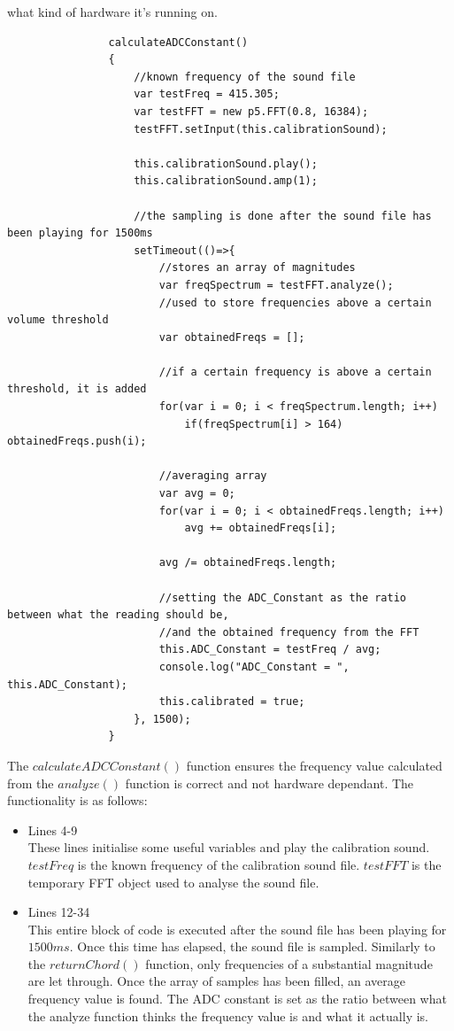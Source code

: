 \documentclass[12pt,a4paper]{article}
\begin{document}
			what kind of hardware it's running on.\\
			\begin{lstlisting}
				calculateADCConstant()
				{
					//known frequency of the sound file
					var testFreq = 415.305;
					var testFFT = new p5.FFT(0.8, 16384);
					testFFT.setInput(this.calibrationSound);
			
					this.calibrationSound.play();
					this.calibrationSound.amp(1);
			
					//the sampling is done after the sound file has been playing for 1500ms
					setTimeout(()=>{
						//stores an array of magnitudes
						var freqSpectrum = testFFT.analyze();
						//used to store frequencies above a certain volume threshold
						var obtainedFreqs = [];
				
						//if a certain frequency is above a certain threshold, it is added
						for(var i = 0; i < freqSpectrum.length; i++)
							if(freqSpectrum[i] > 164) obtainedFreqs.push(i);            
						
						//averaging array
						var avg = 0;
						for(var i = 0; i < obtainedFreqs.length; i++)
							avg += obtainedFreqs[i];
						
						avg /= obtainedFreqs.length;
			
						//setting the ADC_Constant as the ratio between what the reading should be, 
						//and the obtained frequency from the FFT
						this.ADC_Constant = testFreq / avg;
						console.log("ADC_Constant = ", this.ADC_Constant);
						this.calibrated = true;
					}, 1500);
				}
				\end{lstlisting}
					The $calculateADCConstant()$ function ensures the frequency value calculated from the $analyze()$ function is correct and not hardware dependant. The functionality is as follows:
					\begin{itemize}
						\item Lines 4-9\\
							These lines initialise some useful variables and play the calibration sound. 
							$testFreq$ is the known frequency of the calibration sound file. $testFFT$ is the temporary FFT object used to analyse the sound file.
						\item Lines 12-34\\
							This entire block of code is executed after the sound file has been playing for $1500ms$. Once this time has elapsed, the sound file is sampled. Similarly to the $returnChord()$ function,
							only frequencies of a substantial magnitude are let through. Once the array of samples has been filled, an average frequency value is found. The ADC constant is set as the ratio between
							what the analyze function thinks the frequency value is and what it actually is. 
					\end{itemize}
\end{document}
